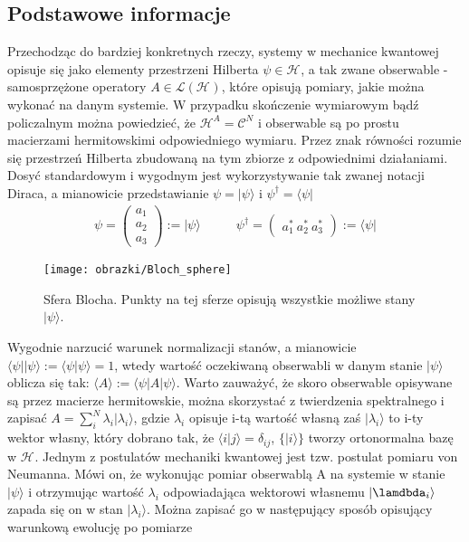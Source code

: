 \documentclass[10pt]{article} %
\newcommand{\Mats}[1]{\mathcal{L}(#1)}
\newcommand{\Hx}[1]{\mathcal{H}^{#1}}
\newcommand{\LHx}[1]{\Mats{\Hx{#1}}}
\newcommand{\Ket}[1]{|#1\rangle}
\newcommand{\Bra}[1]{\langle#1|}
\newcommand{\Braket}[1]{\langle#1\rangle}
\newcommand{\KP}{\Ket{\psi}}
\begin{document}
\subsection{Podstawowe informacje}
Przechodząc do bardziej konkretnych rzeczy, systemy w mechanice kwantowej opisuje się jako elementy przestrzeni Hilberta $\psi \in \Hx{}$, a tak zwane obserwable - samosprzężone operatory $A \in \LHx{}$, które opisują pomiary, jakie można wykonać na danym systemie. W przypadku skończenie wymiarowym bądź policzalnym można powiedzieć, że $\Hx{A} = \mathcal{C}^N$ i
obserwable są po prostu macierzami hermitowskimi odpowiedniego wymiaru. Przez znak równości rozumie się przestrzeń Hilberta zbudowaną na tym zbiorze z odpowiednimi działaniami. Dosyć standardowym i wygodnym jest wykorzystywanie tak zwanej notacji Diraca, a mianowicie przedstawianie $\psi = \Ket{\psi}$ i $\psi^\dag = \Bra{\psi}$
\begin{align}
\psi = 
\begin{pmatrix}
a_1\\a_2\\a_3
\end{pmatrix}
:= \Ket{\psi}
\quad & \quad\psi^\dag = 
\begin{pmatrix}
a_1^*~a_2^*~a_3^*
\end{pmatrix}
:= \Bra{\psi}
\end{align}
\begin{figure}[th]
\centering
\texttt{[image: obrazki/Bloch\_sphere]}
\caption{Sfera Blocha. Punkty na tej sferze opisują wszystkie możliwe stany $\KP$.}
\label{fig:bloch}
\end{figure}
Wygodnie narzucić warunek normalizacji stanów, a mianowicie $\Bra{\psi}\Ket{\psi} := \Braket{\psi|\psi} = 1$, wtedy wartość oczekiwaną obserwabli w danym stanie $\Ket{\psi}$ oblicza się tak: $\Braket{A} := \Bra{\psi}A\Ket{\psi}$. Warto zauważyć, że skoro obserwable opisywane są przez macierze hermitowskie, można 
skorzystać z twierdzenia spektralnego i zapisać $A = \sum_i^N \lambda_i \Ket{\lambda_i}$, gdzie $\lambda_i$ opisuje i-tą wartość własną zaś $\Ket{\lambda_i}$ to i-ty wektor własny, który dobrano tak, że $\Braket{i|j} = \delta_{ij}$, $\{\Ket{i}\}$ tworzy ortonormalna bazę w $\Hx{}$. Jednym z postulatów mechaniki kwantowej jest tzw. postulat pomiaru von Neumanna. Mówi on, że wykonując pomiar obserwablą A na systemie w stanie $\Ket{\psi}$ i otrzymując wartość $\lambda_i$ odpowiadająca wektorowi własnemu $\Ket{\lamdbda_i}$ zapada się on w stan $\Ket{\lambda_i}$. Można zapisać go w następujący sposób opisujący warunkową ewolucję po pomiarze
\end{document}

